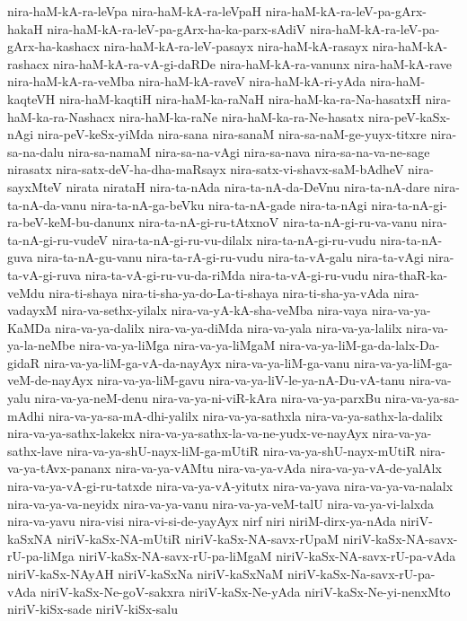 {nira-haM-kA-ra-leVpa
nira-haM-kA-ra-leVpaH
nira-haM-kA-ra-leV-pa-gArx-hakaH
nira-haM-kA-ra-leV-pa-gArx-ha-ka-parx-sAdiV
nira-haM-kA-ra-leV-pa-gArx-ha-kashacx
nira-haM-kA-ra-leV-pasayx
nira-haM-kA-rasayx
nira-haM-kA-rashacx
nira-haM-kA-ra-vA-gi-daRDe
nira-haM-kA-ra-vanunx
nira-haM-kA-rave
nira-haM-kA-ra-veMba
nira-haM-kA-raveV
nira-haM-kA-ri-yAda
nira-haM-kaqteVH
nira-haM-kaqtiH
nira-haM-ka-raNaH
nira-haM-ka-ra-Na-hasatxH
nira-haM-ka-ra-Nashacx
nira-haM-ka-raNe
nira-haM-ka-ra-Ne-hasatx
nira-peV-kaSx-nAgi
nira-peV-keSx-yiMda
nira-sana
nira-sanaM
nira-sa-naM-ge-yuyx-titxre
nira-sa-na-dalu
nira-sa-namaM
nira-sa-na-vAgi
nira-sa-nava
nira-sa-na-va-ne-sage
nirasatx
nira-satx-deV-ha-dha-maRsayx
nira-satx-vi-shavx-saM-bAdheV
nira-sayxMteV
nirata
nirataH
nira-ta-nAda
nira-ta-nA-da-DeVnu
nira-ta-nA-dare
nira-ta-nA-da-vanu
nira-ta-nA-ga-beVku
nira-ta-nA-gade
nira-ta-nAgi
nira-ta-nA-gi-ra-beV-keM-bu-danunx
nira-ta-nA-gi-ru-tAtxnoV
nira-ta-nA-gi-ru-va-vanu
nira-ta-nA-gi-ru-vudeV
nira-ta-nA-gi-ru-vu-dilalx
nira-ta-nA-gi-ru-vudu
nira-ta-nA-guva
nira-ta-nA-gu-vanu
nira-ta-rA-gi-ru-vudu
nira-ta-vA-galu
nira-ta-vAgi
nira-ta-vA-gi-ruva
nira-ta-vA-gi-ru-vu-da-riMda
nira-ta-vA-gi-ru-vudu
nira-thaR-ka-veMdu
nira-ti-shaya
nira-ti-sha-ya-do-La-ti-shaya
nira-ti-sha-ya-vAda
nira-vadayxM
nira-va-sethx-yilalx
nira-va-yA-kA-sha-veMba
nira-vaya
nira-va-ya-KaMDa
nira-va-ya-dalilx
nira-va-ya-diMda
nira-va-yala
nira-va-ya-lalilx
nira-va-ya-la-neMbe
nira-va-ya-liMga
nira-va-ya-liMgaM
nira-va-ya-liM-ga-da-lalx-Da-gidaR
nira-va-ya-liM-ga-vA-da-nayAyx
nira-va-ya-liM-ga-vanu
nira-va-ya-liM-ga-veM-de-nayAyx
nira-va-ya-liM-gavu
nira-va-ya-liV-le-ya-nA-Du-vA-tanu
nira-va-yalu
nira-va-ya-neM-denu
nira-va-ya-ni-viR-kAra
nira-va-ya-parxBu
nira-va-ya-sa-mAdhi
nira-va-ya-sa-mA-dhi-yalilx
nira-va-ya-sathxla
nira-va-ya-sathx-la-dalilx
nira-va-ya-sathx-lakekx
nira-va-ya-sathx-la-va-ne-yudx-ve-nayAyx
nira-va-ya-sathx-lave
nira-va-ya-shU-nayx-liM-ga-mUtiR
nira-va-ya-shU-nayx-mUtiR
nira-va-ya-tAvx-pananx
nira-va-ya-vAMtu
nira-va-ya-vAda
nira-va-ya-vA-de-yalAlx
nira-va-ya-vA-gi-ru-tatxde
nira-va-ya-vA-yitutx
nira-va-yava
nira-va-ya-va-nalalx
nira-va-ya-va-neyidx
nira-va-ya-vanu
nira-va-ya-veM-talU
nira-va-ya-vi-lalxda
nira-va-yavu
nira-visi
nira-vi-si-de-yayAyx
nirf
niri
niriM-dirx-ya-nAda
niriV-kaSxNA
niriV-kaSx-NA-mUtiR
niriV-kaSx-NA-savx-rUpaM
niriV-kaSx-NA-savx-rU-pa-liMga
niriV-kaSx-NA-savx-rU-pa-liMgaM
niriV-kaSx-NA-savx-rU-pa-vAda
niriV-kaSx-NAyAH
niriV-kaSxNa
niriV-kaSxNaM
niriV-kaSx-Na-savx-rU-pa-vAda
niriV-kaSx-Ne-goV-sakxra
niriV-kaSx-Ne-yAda
niriV-kaSx-Ne-yi-nenxMto
niriV-kiSx-sade
niriV-kiSx-salu
}
